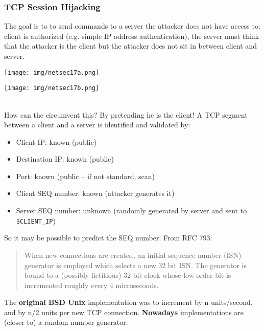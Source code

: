 \documentclass[a4paper, 10pt, titlepage]{article}
\begin{document}
\subsubsection{TCP Session Hijacking}
The goal is to to send commands to a server the attacker does not have access to: client is authorized (e.g. simple IP address authentication), the server must think that the attacker is the client but the attacker does not sit in between client and server. \medskip\\

\begin{minipage}{0.55\textwidth}
	\begin{center}
		\texttt{[image: img/netsec17a.png]}
	\end{center}
\end{minipage}
\hfill
\begin{minipage}{0.35\textwidth}
	\begin{center}
		\texttt{[image: img/netsec17b.png]}
	\end{center}
\end{minipage} \medskip\\
How can the circumvent this? By pretending he is the client! A TCP segment between a client and a server is identified and validated by:
\begin{itemize}
	\item Client IP: known (public)
	\item Destination IP: known (public)
	\item Port: known (public – if not standard, scan)
	\item Client SEQ number: known (attacker generates it)
	\item Server SEQ number: unknown (randomly generated by server and sent to \lstinline|$CLIENT_IP|)
\end{itemize}
So it may be possible to predict the SEQ number. From RFC 793:
\begin{quote}
	When new connections are created, an initial sequence 	number (ISN) generator is employed which selects a new 32 	bit ISN. The generator is bound to a (possibly fictitious) 32 bit clock whose low order bit is incremented roughly every 4 microseconds.
\end{quote}
The \textbf{original BSD Unix} implementation was to increment by n units/second, and by n/2 units per new TCP connection. \textbf{Nowadays} implementations are (closer to) a random number generator.
\end{document}
